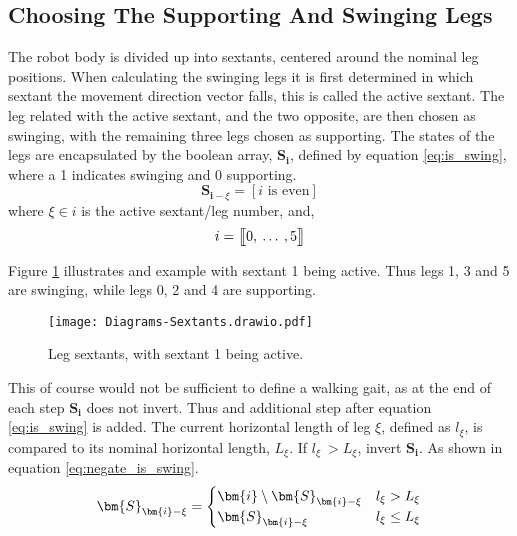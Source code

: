         \newpage
        \subsection{Choosing The Supporting And Swinging Legs} \label{sec:supp_swing_calc}
            The robot body is divided up into sextants, centered around the nominal leg positions. When calculating
            the swinging legs it is first determined in which sextant the movement direction vector falls, this is called the active sextant.
            The leg related with the active sextant, and the two opposite, are then chosen as swinging, with the remaining three legs chosen as supporting.
            The states of the legs are encapsulated by the boolean array, \(\bm{S_i}\), defined by equation \ref{eq:is_swing},
            where a 1 indicates swinging and 0 supporting.
            \begin{equation}\label{eq:is_swing}
                \bm{S}_{\bm{i} - \xi}=[i \text{ is even}]
            \end{equation}
            where \(\xi \in i\) is the active sextant/leg number, and,
            \[i = \seq{0}{1}{5}\]

            Figure \ref{fig:sextants} illustrates and example with sextant 1 being active. Thus legs 1, 3 and 5 are swinging, while legs 0, 2 and 4 are supporting.
            \begin{figure}[h]
                \centering
                \hspace{1.1cm}
                \texttt{[image: Diagrams-Sextants.drawio.pdf]}
                \caption{Leg sextants, with sextant 1 being active.} 
                \label{fig:sextants}
            \end{figure}
            
            \noindent
            This of course would not be sufficient to define a walking gait, as at the end of each step \(\bm{S_i}\) does not invert.
            Thus and additional step after equation \ref{eq:is_swing} is added. The current horizontal length of leg \(\xi\), defined as \(l_\xi\), is compared to its nominal
            horizontal length, \(L_\xi\). If \(l_\xi\ > L_\xi\), invert \(\bm{S_i}\). As shown in equation \ref{eq:negate_is_swing}.
            \begin{equation} \label{eq:negate_is_swing}
                \bm{S}_{\bm{i} - \xi} =
                                                    \begin{cases}
                                                        \bm{i} \setminus \bm{S}_{\bm{i} - \xi} & l_\xi > L_\xi \\
                                                        \bm{S}_{\bm{i} - \xi} & l_\xi \leq L_\xi
                                                    \end{cases}\\[0.1cm]
            \end{equation}

